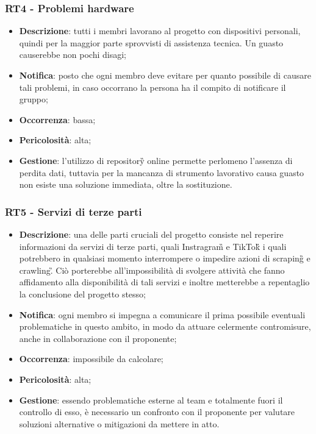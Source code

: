	\subsubsection*{RT4 - Problemi hardware}
	\begin{itemize}
		\item \textbf{Descrizione}: tutti i membri lavorano al progetto con dispositivi personali, quindi per la maggior parte sprovvisti di assistenza tecnica. Un guasto causerebbe non pochi disagi;
		\item \textbf{Notifica}: posto che ogni membro deve evitare per quanto possibile di causare tali problemi, in caso occorrano la persona ha il compito di notificare il gruppo;
		\item \textbf{Occorrenza}: bassa;
		\item \textbf{Pericolosità}: alta;
		\item \textbf{Gestione}: l'utilizzo di repository\G{} online permette perlomeno l'assenza di perdita dati, tuttavia per la mancanza di strumento lavorativo causa guasto non esiste una soluzione immediata, oltre la sostituzione.
	\end{itemize}

	\subsubsection*{RT5 - Servizi di terze parti}
	\begin{itemize}
		\item \textbf{Descrizione}: una delle parti cruciali del progetto consiste nel reperire informazioni da servizi di terze parti, quali Instragram\G{} e TikTok\G{} i quali potrebbero in qualsiasi momento interrompere o impedire azioni di scraping\G{} e crawling\G. Ciò porterebbe all'impossibilità di svolgere attività che fanno affidamento alla disponibilità di tali servizi e inoltre metterebbe a repentaglio la conclusione del progetto stesso;
		\item \textbf{Notifica}: ogni membro si impegna a comunicare il prima possibile eventuali problematiche in questo ambito, in modo da attuare celermente contromisure, anche in collaborazione con il proponente;
		\item \textbf{Occorrenza}: impossibile da calcolare;
		\item \textbf{Pericolosità}: alta;
		\item \textbf{Gestione}: essendo problematiche esterne al team e totalmente fuori il controllo di esso, è necessario un confronto con il proponente per valutare soluzioni alternative o mitigazioni da mettere in atto.
	\end{itemize}

